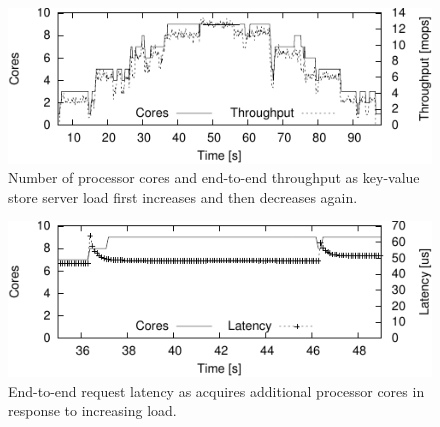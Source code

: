 \begin{figure}
  \centering
  \includegraphics[width=\columnwidth]{plots/autoscale/autoscale}
  \caption{Number of \rmttcp processor cores and end-to-end throughput as
  key-value store server load first increases and then decreases again.}
  \label{fig:autoscale_tp}
\end{figure}

\begin{figure}
  \centering
  \includegraphics[width=\columnwidth]{plots/autoscale/autoscale_latency}
  \caption{End-to-end request latency as \rmttcp acquires additional processor
  cores in response to increasing load.}
  \label{fig:autoscale_l}
\end{figure}

